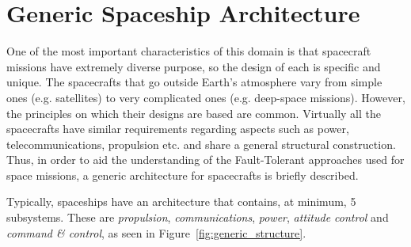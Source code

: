 \section{Generic Spaceship Architecture}
One of the most important characteristics of this domain is that spacecraft
missions have extremely diverse purpose, so the design of each is specific and
unique. The spacecrafts that go outside Earth's atmosphere vary from simple ones
(e.g. satellites) to very complicated ones (e.g. deep-space missions). However,
the principles on which their designs are based are common. Virtually all the
spacecrafts have similar requirements regarding aspects such as power,
telecommunications, propulsion etc. and share a general structural construction.
Thus, in order to aid the understanding of the Fault-Tolerant approaches used
for space missions, a generic architecture for spacecrafts is briefly described.

Typically, spaceships have an architecture that contains, at minimum, 5
subsystems\cite{ft-space-avionics}. These are \textit{propulsion},
\textit{communications}, \textit{power}, \textit{attitude control} and
\textit{command \& control}, as seen in Figure~\ref{fig:generic_structure}.

